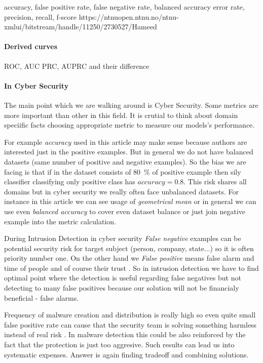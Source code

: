 accuracy, false positive rate, false negative rate, balanced accuracy error rate, precision, recall, f-score
\cite{Hossin2015}
https://ntnuopen.ntnu.no/ntnu-xmlui/bitstream/handle/11250/2730527/Hameed%

\paragraph{Derived curves}
ROC, AUC \cite{Fawcett2006}
PRC, AUPRC \cite{Flach2015}
and their difference

\paragraph{In Cyber Security}
The main point which we are walking around is Cyber Security. Some metrics are more important than other in this field. It is crutial to think about domain speciific facts choosing appropriate metric to measure our models's performance.

For example \emph{accuracy} used in this article \cite{Ghanaei2016} may make sense because authors are interested just in the positive examples. But in general we do not have balanced datasets (same number of positive and negative examples). So the bias we are facing is that if in the dataset consists of 80~\% of positive example then sily classifier classifying only positive class has $accuracy=0.8$. This risk shares all domains but in cyber security we really often face unbalanced datasets. For instance in this article \cite{Hernandez-Callejo2019} we can see usage of \emph{geometrical mean} or in general we can use even \emph{balanced accuracy} to cover even dataset balance or just join negative example into the metric calculation.


During Intrusion Detection in cyber security \emph{False negative} examples can be potential security risk for target subject (person, company, state...) so it is often priority number one. On the other hand we \emph{False positive} means false alarm and time of people and of course their trust \cite{owaspintrusion}. So in intrusion detection we have to find optimal point where the detection is useful regarding false negatives but not detecting to many false positives because our solution will not be financialy beneficial - false alarms.

Frequency of malware creation and distribution is really high so even quite small false positive rate can cause that the security team is solving something harmless instead of real risk \cite{Apruzzese2018}. In malware detection this could be also reinforced by the fact that the protection is just too aggresive. Such results can lead us into systematic expenses. Answer is again finding tradeoff and combining solutions.\cite{Kubovic2017}

